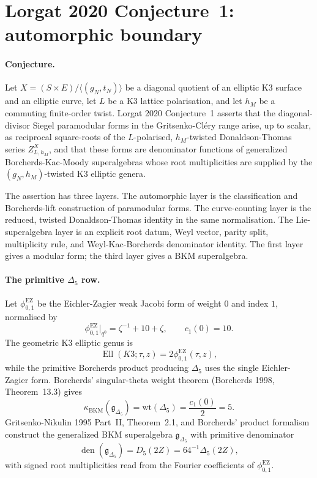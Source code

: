 \providecommand{\kBKM}{\kappa_{\mathrm{BKM}}}
\providecommand{\kch}{\kappa_{\mathrm{ch}}}
\providecommand{\kcat}{\kappa_{\mathrm{cat}}}
\providecommand{\kfib}{\kappa_{\mathrm{fiber}}}
\providecommand{\ZLh}{Z^{X}_{L,h_M}}
\providecommand{\gDelta}{\mathfrak{g}_{\Delta_5}}

\section*{Lorgat 2020 Conjecture~1: automorphic boundary}

\paragraph{Conjecture.}
Let $X=(S\times E)/\langle(g_N,t_N)\rangle$ be a diagonal quotient of
an elliptic K3 surface and an elliptic curve, let $L$ be a K3 lattice
polarisation, and let $h_M$ be a commuting finite-order twist. Lorgat
2020 Conjecture~1 asserts that the diagonal-divisor Siegel paramodular
forms in the Gritsenko-Cl\'ery range arise, up to scalar, as
reciprocal square-roots of the $L$-polarised, $h_M$-twisted
Donaldson-Thomas series $\ZLh$, and that these forms are denominator
functions of generalized Borcherds-Kac-Moody superalgebras whose root
multiplicities are supplied by the $(g_N,h_M)$-twisted K3 elliptic
genera.

The assertion has three layers. The automorphic layer is the
classification and Borcherds-lift construction of paramodular forms.
The curve-counting layer is the reduced, twisted Donaldson-Thomas
identity in the same normalisation. The Lie-superalgebra layer is an
explicit root datum, Weyl vector, parity split, multiplicity rule, and
Weyl-Kac-Borcherds denominator identity. The first layer gives a
modular form; the third layer gives a BKM superalgebra.

\paragraph{The primitive \texorpdfstring{$\Delta_5$}{Delta5} row.}
Let $\phi_{0,1}^{\mathrm{EZ}}$ be the Eichler-Zagier weak Jacobi form
of weight $0$ and index $1$, normalised by
\[
  \phi_{0,1}^{\mathrm{EZ}}\big|_{q^0}=\zeta^{-1}+10+\zeta,
  \qquad c_1(0)=10.
\]
The geometric K3 elliptic genus is
\[
  \operatorname{Ell}(K3;\tau,z)=2\phi_{0,1}^{\mathrm{EZ}}(\tau,z),
\]
while the primitive Borcherds product producing $\Delta_5$ uses the
single Eichler-Zagier form. Borcherds' singular-theta weight theorem
(Borcherds 1998, Theorem~13.3) gives
\[
  \kBKM(\gDelta)=\mathrm{wt}(\Delta_5)=\frac{c_1(0)}{2}=5.
\]
Gritsenko-Nikulin 1995 Part~II, Theorem~2.1, and Borcherds' product
formalism construct the generalized BKM superalgebra $\gDelta$ with
primitive denominator
\[
  \operatorname{den}(\gDelta)=D_5(2Z)=64^{-1}\Delta_5(2Z),
\]
with signed root multiplicities read from the Fourier coefficients of
$\phi_{0,1}^{\mathrm{EZ}}$.

